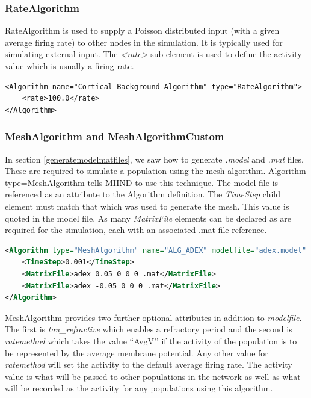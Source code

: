 \documentclass[utf8]{frontiersSCNS} %
\begin{document}
\subsubsection{RateAlgorithm}

RateAlgorithm is used to supply a Poisson distributed input (with a given average firing rate) to other nodes in the simulation. It is typically used for simulating external input. The \textit{\textless rate\textgreater} sub-element is used to define the activity value which is usually a firing rate. 

\begin{lstlisting}[caption={A RateAlgorithm definition with a constant rate of 100Hz.}]
<Algorithm name="Cortical Background Algorithm" type="RateAlgorithm">
	<rate>100.0</rate>
</Algorithm>
\end{lstlisting}

\subsubsection{MeshAlgorithm and MeshAlgorithmCustom}

In section \ref{generatemodelmatfiles}, we saw how to generate \textit{.model} and \textit{.mat} files. These are required to simulate a population using the mesh algorithm. Algorithm type=MeshAlgorithm tells MIIND to use this technique. The model file is referenced as an attribute to the Algorithm definition. The \textit{TimeStep} child element must match that which was used to generate the mesh. This value is quoted in the model file. As many \textit{MatrixFile} elements can be declared as are required for the simulation, each with an associated .mat file reference.

\begin{lstlisting}[language=xml,caption={A MeshAlgorithm definition with two matrix files.}]
<Algorithm type="MeshAlgorithm" name="ALG_ADEX" modelfile="adex.model" >
	<TimeStep>0.001</TimeStep>
	<MatrixFile>adex_0.05_0_0_0_.mat</MatrixFile>
	<MatrixFile>adex_-0.05_0_0_0_.mat</MatrixFile>
</Algorithm>
\end{lstlisting}

MeshAlgorithm provides two further optional attributes in addition to \textit{modelfile}. The first is \textit{tau\_refractive} which enables a refractory period and the second is \textit{ratemethod} which takes the value ``AvgV’’ if the activity of the population is to be represented by the average membrane potential. Any other value for \textit{ratemethod} will set the activity to the default average firing rate. The activity value is what will be passed to other populations in the network as well as what will be recorded as the activity for any populations using this algorithm.
\end{document}
